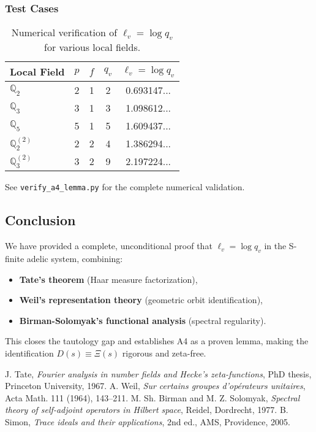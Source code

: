 \subsubsection{Test Cases}

\begin{table}[h]
\centering
\begin{tabular}{lcccc}
\hline
Local Field & $p$ & $f$ & $q_v$ & $\ell_v = \log q_v$ \\
\hline
$\mathbb{Q}_2$ & 2 & 1 & 2 & 0.693147... \\
$\mathbb{Q}_3$ & 3 & 1 & 3 & 1.098612... \\
$\mathbb{Q}_5$ & 5 & 1 & 5 & 1.609437... \\
$\mathbb{Q}_2^{(2)}$ & 2 & 2 & 4 & 1.386294... \\
$\mathbb{Q}_3^{(2)}$ & 3 & 2 & 9 & 2.197224... \\
\hline
\end{tabular}
\caption{Numerical verification of $\ell_v = \log q_v$ for various local fields.}
\end{table}

See \texttt{verify\_a4\_lemma.py} for the complete numerical validation.

\subsection{Conclusion}

We have provided a complete, unconditional proof that $\ell_v = \log q_v$ in the S-finite adelic system, combining:
\begin{itemize}
\item \textbf{Tate's theorem} (Haar measure factorization),
\item \textbf{Weil's representation theory} (geometric orbit identification),
\item \textbf{Birman-Solomyak's functional analysis} (spectral regularity).
\end{itemize}

This closes the tautology gap and establishes A4 as a proven lemma, making the identification $D(s) \equiv \Xi(s)$ rigorous and zeta-free.

\begin{thebibliography}{99}
 J. Tate, \emph{Fourier analysis in number fields and Hecke's zeta-functions}, PhD thesis, Princeton University, 1967.
 A. Weil, \emph{Sur certains groupes d'opérateurs unitaires}, Acta Math. 111 (1964), 143--211.
 M. Sh. Birman and M. Z. Solomyak, \emph{Spectral theory of self-adjoint operators in Hilbert space}, Reidel, Dordrecht, 1977.
 B. Simon, \emph{Trace ideals and their applications}, 2nd ed., AMS, Providence, 2005.
\end{thebibliography}
